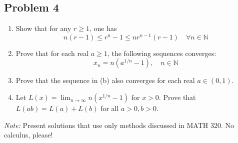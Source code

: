 \documentclass{article}
\newcommand{\N}{{\mathbb N}}
\begin{document}
\subsection*{Problem 4}
{\it \begin{enumerate}
	\item Show that for any $r \geq 1$, one has
		\[
			n(r-1) \leq r^n - 1 \leq nr^{n-1}(r-1) \quad \forall n \in \N
		\]
	\item Prove that for each real $a \geq 1$, the following sequences converges:
		\[
			x_n = n\left(a^{1/n} - 1\right), \quad n \in \N
		\]
	\item Prove that the sequence in (b) also converges for each real $a \in (0,1)$.
	\item Let $L(x) = \lim_{n\to\infty} n\left(x^{1/n}-1\right)$ for $x > 0$.
		Prove that $L(ab) = L(a) + L(b)$ for all $a > 0, b > 0$.
\end{enumerate}
\emph{Note:} Present solutions that use only methods discussed in MATH 320.
No calculus, please!}
\end{document}
